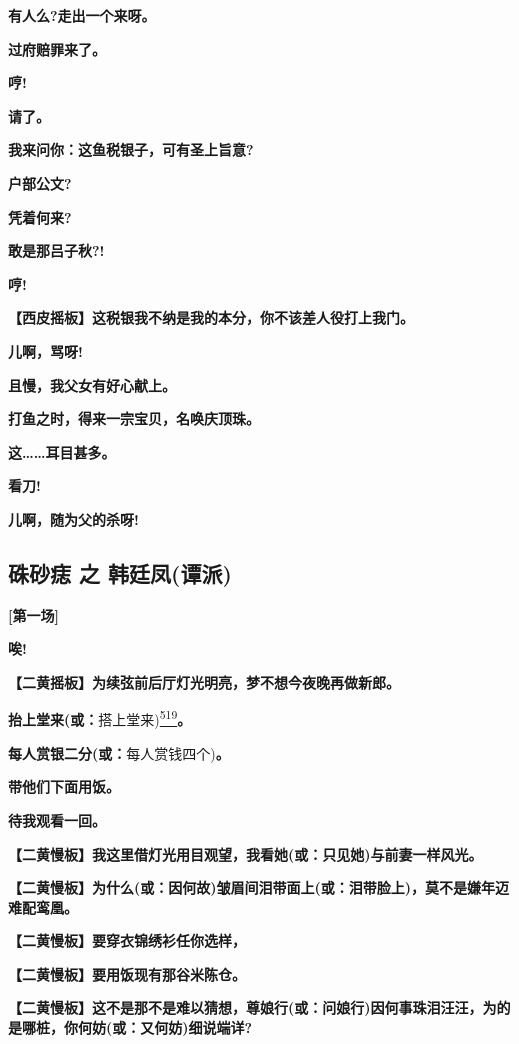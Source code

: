 \textbf{有人么?走出一个来呀。}

\textbf{过府赔罪来了。}

\textbf{哼!}

\textbf{请了。}

\textbf{我来问你：这鱼税银子，可有圣上旨意?}

\textbf{户部公文?}

\textbf{凭着何来?}

\textbf{敢是那吕子秋?!}

\textbf{哼!}

\textbf{【西皮摇板】这税银我不纳是我的本分，你不该差人役打上我门。}

\textbf{儿啊，骂呀!}

\textbf{且慢，我父女有好心献上。}

\textbf{打鱼之时，得来一宗宝贝，名唤庆顶珠。}

\textbf{这\ldots{}\ldots{}耳目甚多。}

\textbf{看刀!}

\textbf{儿啊，随为父的杀呀!}

\newpage
\hypertarget{ux7843ux7802ux75e3-ux4e4b-ux97e9ux5ef7ux51e4ux8c2dux6d3e}{%
\subsection{硃砂痣 之
韩廷凤(谭派)}\label{ux7843ux7802ux75e3-ux4e4b-ux97e9ux5ef7ux51e4ux8c2dux6d3e}}

\textbf{{[}第一场{]}}

\textbf{唉!}

\textbf{【二黄摇板】为续弦前后厅灯光明亮，梦不想今夜晚再做新郎。}

\textbf{抬上堂来(或：}搭上堂来)\protect\hyperlink{fn519}{\textsuperscript{519}}\textbf{。}

\textbf{每人赏银二分(或：}每人赏钱四个)\textbf{。}

\textbf{带他们下面用饭。}

\textbf{待我观看一回。}

\textbf{【二黄慢板】我这里借灯光用目观望，我看她(或：只见她)与前妻一样风光。}

\textbf{【二黄慢板】为什么(或：因何故)皱眉间泪带面上(或：泪带脸上)，莫不是嫌年迈难配鸾凰。}

\textbf{【二黄慢板】要穿衣锦绣衫任你选样，}

\textbf{【二黄慢板】要用饭现有那谷米陈仓。}

\textbf{【二黄慢板】这不是那不是难以猜想，尊娘行(或：问娘行)因何事珠泪汪汪，为的是哪桩，你何妨(或：又何妨)细说端详?}

